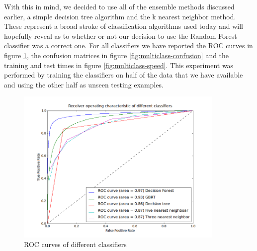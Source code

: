 \documentclass[ %
                    author={Sam Phippen},
                supervisor={Dr. Rafal Bogacz},
                     title={Real time voice activity detectors in noisy personal computing environments},
                  subtitle={},
                    degree={MEng},
                      year={2012} ]{thesis}
\begin{document}
With this in mind, we decided to use all of the ensemble methods discussed
earlier, a simple decision tree algorithm and the k nearest neighbor method.
These represent a broad stroke of classification algorithms used today and will
hopefully reveal as to whether or not our decision to use the Random Forest
classifier was a correct one. For all classifiers we have reported the ROC
curves in figure \ref{fig:multiclass-roc}, the confusion matrices in
figure \ref{fig:multiclass-confusion} and the training and test times in
figure \ref{fig:multiclass-speed}. This experiment was performed by training the
classifiers on half of the data that we have available and using the other half
as unseen testing examples.

\begin{figure}
    \includegraphics[width=10cm]{roc_different.png}
    \caption{ROC curves of different classifiers}
    \label{fig:multiclass-roc}
\end{figure}
\end{document}

